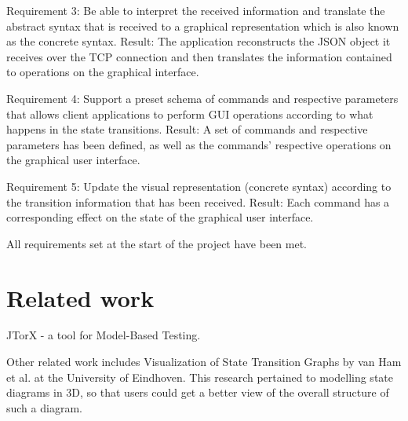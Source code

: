 \documentclass[11pt,a4paper]{article}
\begin{document}
Requirement 3: Be able to interpret the received information and translate the abstract syntax that is received to a graphical representation which is also known as the concrete syntax.
Result: The application reconstructs the JSON object it receives over the TCP connection and then translates the information contained to operations on the graphical interface.

Requirement 4: Support a preset schema of commands and respective parameters that allows client applications to perform GUI operations according to what happens in the state transitions.
Result: A set of commands and respective parameters has been defined, as well as the commands' respective operations on the graphical user interface.

Requirement 5: Update the visual representation (concrete syntax) according to the transition information that has been received.
Result: Each command has a corresponding effect on the state of the graphical user interface.

All requirements set at the start of the project have been met.


\section{Related work}
JTorX - a tool for Model-Based Testing.

Other related work includes Visualization of State Transition Graphs by van Ham et al. at the University of Eindhoven. This research pertained to modelling state diagrams in 3D, so that users could get a better view of the overall structure of such a diagram.
\end{document}
